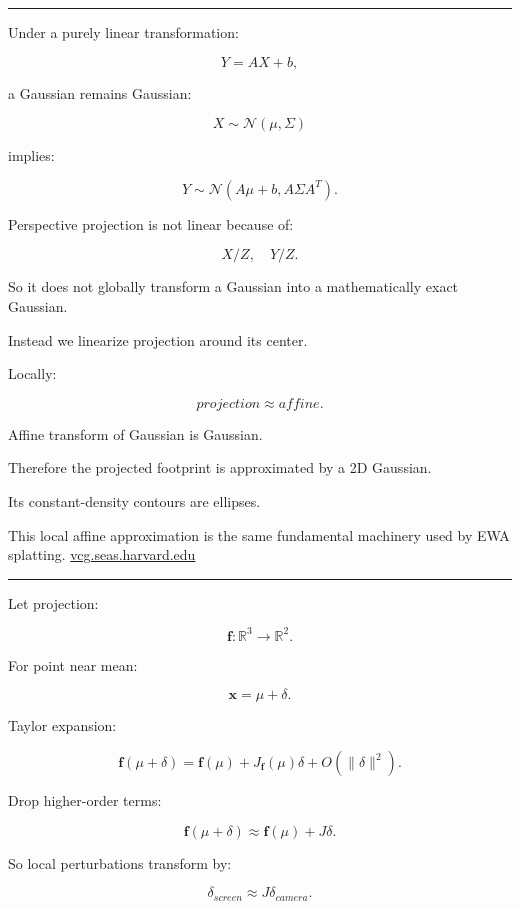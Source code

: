 \begin{center}\rule{0.5\linewidth}{0.5pt}\end{center}

Under a purely linear transformation:

\[
Y=AX+b,
\]

a Gaussian remains Gaussian:

\[
X\sim\mathcal N(\mu,\Sigma)
\]

implies:

\[
Y
\sim
\mathcal N(
A\mu+b,
A\Sigma A^T
).
\]

Perspective projection is not linear because of:

\[
X/Z,\quad Y/Z.
\]

So it does not globally transform a Gaussian into a mathematically exact Gaussian.

Instead we linearize projection around its center.

Locally:

\[
projection
\approx
affine.
\]

Affine transform of Gaussian is Gaussian.

Therefore the projected footprint is approximated by a 2D Gaussian.

Its constant-density contours are ellipses.

This local affine approximation is the same fundamental machinery used by EWA splatting. \href{https://vcg.seas.harvard.edu/content/3-publications/20010101-surface-splatting/p371-zwicker.pdf?utm_source=chatgpt.com}{vcg.seas.harvard.edu}

\begin{center}\rule{0.5\linewidth}{0.5pt}\end{center}

Let projection:

\[
\mathbf f:
\mathbb R^3
\rightarrow
\mathbb R^2.
\]

For point near mean:

\[
\mathbf x=
\mu+\delta.
\]

Taylor expansion:

\[
\mathbf f(\mu+\delta)
=
\mathbf f(\mu)
+
J_{\mathbf f}(\mu)\delta
+
O(\|\delta\|^2).
\]

Drop higher-order terms:

\[
\boxed{
\mathbf f(\mu+\delta)
\approx
\mathbf f(\mu)
+
J\delta.
}
\]

So local perturbations transform by:

\[
\delta_{screen}
\approx
J\delta_{camera}.
\]

